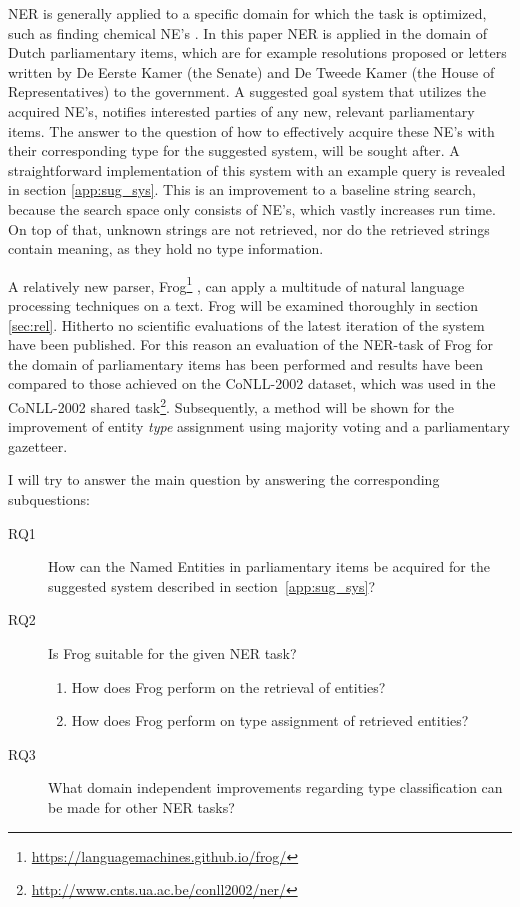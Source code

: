 NER is generally applied to a specific domain for which the task is optimized, such as finding chemical NE's \cite{rocktaschel2012chemspot}. 
In this paper NER is applied in the domain of Dutch parliamentary items, which are for example resolutions proposed or letters written by De Eerste Kamer (the Senate) and De Tweede Kamer (the House of Representatives) to the government. A suggested goal system that utilizes the acquired NE's, notifies interested parties of any new, relevant parliamentary items.
The answer to the question of how to effectively acquire these NE's with their corresponding type for the suggested system, will be sought after. A straightforward implementation of this system with an example query is revealed in section \ref{app:sug_sys}.
This is an improvement to a baseline string search, because the search space only consists of NE's, which vastly increases run time. On top of that, unknown strings are not retrieved, nor do the retrieved strings contain meaning, as they hold no type information.

A relatively new parser, Frog\footnote{\url{https://languagemachines.github.io/frog/}} \cite{bosch2007efficient},  can apply a multitude of natural language processing techniques on a text. Frog will be examined thoroughly in section \ref{sec:rel}. Hitherto no scientific evaluations of the latest iteration of the system have been published. For this reason an evaluation of  the NER-task of Frog for the domain of parliamentary items has been performed and results have been compared to those achieved on the CoNLL-2002 dataset, which was used in the CoNLL-2002 shared task\footnote{\url{http://www.cnts.ua.ac.be/conll2002/ner/}}. Subsequently, a method will be shown for the improvement of entity \textit{type} assignment using majority voting and a parliamentary gazetteer.

I will try to answer the main question by answering the corresponding subquestions:
\begin{description}
\item[RQ1]How can the Named Entities in parliamentary items be acquired for the suggested system described in section~\ref{app:sug_sys}? 
\item[RQ2] Is Frog suitable for the given NER task?
\begin{enumerate}
\item How does Frog perform on the retrieval of entities?
\item How does Frog perform on type assignment of retrieved entities?
\end{enumerate}
\item[RQ3] What domain independent improvements regarding type classification can be made for other NER tasks?
\end{description}

